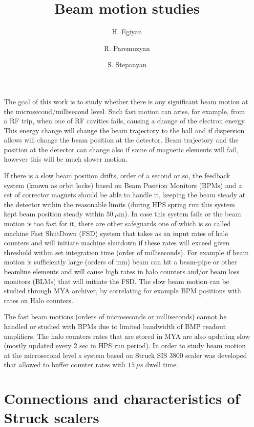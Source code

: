 \documentclass[letterpaper,12pt]{article}
\title{Beam motion studies}
\author[1]{H. Egiyan}
\author[2]{R. Paremuzyan}
\author[1]{S. Stepanyan}
\affil[1]{Thomas Jefferson National Accelerator Facility, Newport News, VA 23606}
\affil[2] {University of New Hampshire,  Durham, NH 03824}
\begin{document}
\maketitle

The goal of this work is to study whether there is any significant beam motion at the microsecond/millisecond level.
Such fast motion can arise, for example, from a RF trip, when one of RF cavities fails, causing a change of the electron energy. 
This energy change will change the beam trajectory to the hall and if dispersion allows will change
the beam position at the detector. Beam trajectory and the position at the detector can change also 
if some of magnetic elements will fail, however this will be much slower motion. 
  
If there is a slow beam position drifts, order of a second or so, the feedback system (known as orbit locks) based
on Beam Position Monitors (BPMs) and a set of corrector magnets should be able to handle it, 
keeping the beam steady at the detector within the reasonable limits
(during HPS spring run this system kept beam position steady within $50~\mu$m). 
In case this system fails or the beam motion is too fast for it, 
there are other safeguards one of which is so called machine Fast ShutDown (FSD) system 
that takes as an input rates of halo counters and will initiate machine shutdown 
if these rates will exceed given threshold within set integration time (order of milliseconds). 
For example if beam motion is sufficiently large (orders of mm) beam can hit a beam-pipe or other beamline elements
and will cause high rates in halo counters and/or beam loss monitors (BLMs) that will initiate the FSD.
The slow beam motion can be studied through MYA archiver, by correlating for example BPM positions with rates on Halo counters.

The fast beam motions (orders of microseconds or milliseconds) cannot be handled or studied with BPMs due to limited bandwidth of BMP readout amplifiers. The halo counters rates that are stored in MYA are also updating slow (mostly updated every 2 sec in HPS run period). In order to study beam motion at the microsecond level a system based on Struck SIS 3800 scaler was developed that allowed to buffer counter rates with $15~\mu$s dwell time. 
  
 \section{Connections and characteristics of Struck scalers}
 \indent
 
\end{document}
